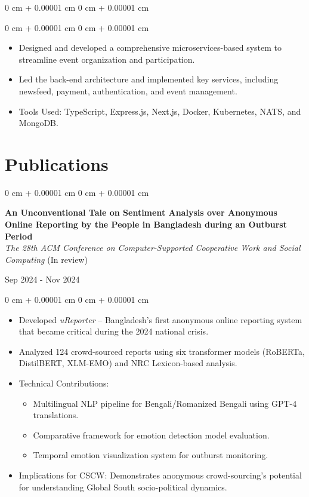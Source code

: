 \documentclass[10pt, letterpaper]{article}
\newenvironment{highlights}{
    \begin{itemize}[
        topsep=0.10 cm,
        parsep=0.10 cm,
        partopsep=0pt,
        itemsep=0pt,
        leftmargin=0 cm + 10pt
    ]
}{
    \end{itemize}
} %
\newenvironment{onecolentry}{
    \begin{adjustwidth}{
        0 cm + 0.00001 cm
    }{
        0 cm + 0.00001 cm
    }
}{
    \end{adjustwidth}
} %
\newenvironment{twocolentry}[2][]{
    \onecolentry
    \def\secondColumn{#2}
    \setcolumnwidth{\fill, 4.5 cm}
    \begin{paracol}{2}
}{
    \switchcolumn \raggedleft \secondColumn
    \end{paracol}
    \endonecolentry
} %
\begin{document}
\begin{onecolentry}
        \vspace{0.10 cm}
        
        \begin{onecolentry}
            \begin{highlights}
    \item Designed and developed a comprehensive microservices-based system to streamline event organization and participation.
    \item Led the back-end architecture and implemented key services, including newsfeed, payment, authentication, and event management.
    \item Tools Used: TypeScript, Express.js, Next.js, Docker, Kubernetes, NATS, and MongoDB.
\end{highlights}
        \end{onecolentry}


        \vspace{0.2 cm}

\section{Publications}

\begin{twocolentry}{Sep 2024 - Nov 2024}
    \textbf{An Unconventional Tale on Sentiment Analysis over Anonymous Online Reporting by the People in Bangladesh during an Outburst Period} \\
    \textit{The 28th ACM Conference on Computer-Supported Cooperative Work and Social Computing} (In review)
\end{twocolentry}

\begin{onecolentry}
    \begin{highlights}
        \item Developed \textit{uReporter} -- Bangladesh's first anonymous online reporting system that became critical during the 2024 national crisis.
        \item Analyzed 124 crowd-sourced reports using six transformer models (RoBERTa, DistilBERT, XLM-EMO) and NRC Lexicon-based analysis.
        
        \item Technical Contributions:
            \begin{itemize}
                \item Multilingual NLP pipeline for Bengali/Romanized Bengali using GPT-4 translations.
                \item Comparative framework for emotion detection model evaluation.
                \item Temporal emotion visualization system for outburst monitoring.
            \end{itemize}
        \item Implications for CSCW: Demonstrates anonymous crowd-sourcing's potential for understanding Global South socio-political dynamics.
    \end{highlights}
\end{onecolentry}


\end{onecolentry}
\end{document}
